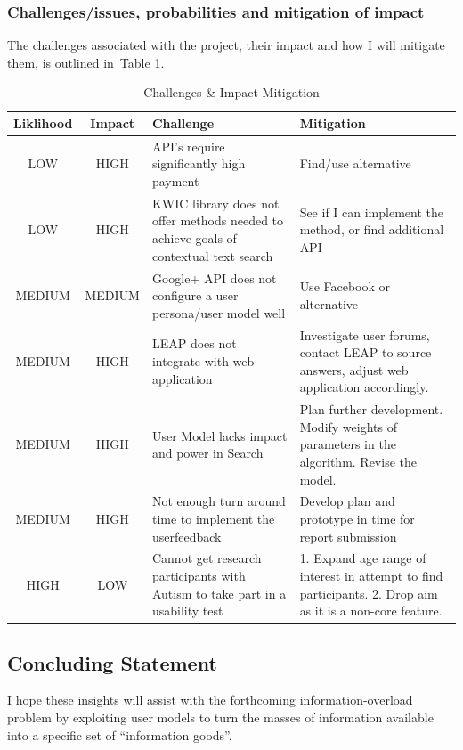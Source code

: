 \documentclass[a4paper, 10pt]{article}
\begin{document}
\subsubsection{Challenges/issues, probabilities and mitigation of impact}
The challenges associated with the project, their impact and how I will mitigate them, is outlined in~Table \ref{risks}. 
\begin{table}[H]
\caption{Challenges \& Impact Mitigation} 
\centering
\begin{tabular}{|c | c | p{5cm} | p{5cm} |}
\hline\hline 
Liklihood & Impact & Challenge & Mitigation\\ [0.5ex]
\hline 
LOW & HIGH & API's require significantly high payment & Find/use alternative\\
\hline 
LOW & HIGH & KWIC library does not offer methods needed to achieve goals of contextual text search & See if I can implement the method, or find additional API\\
\hline 
MEDIUM & MEDIUM & Google+ API does not configure a user persona/user model well & Use Facebook or alternative\\
\hline 
MEDIUM & HIGH & LEAP does not integrate with web application & Investigate user forums, contact LEAP to source answers, adjust web application accordingly.\\
\hline
MEDIUM & HIGH & User Model lacks impact and power in Search & Plan further development. Modify weights of parameters in the algorithm. Revise the model. \\
\hline 
MEDIUM & HIGH & Not enough turn around time to implement the userfeedback & Develop plan and prototype in time for report submission\\
\hline
HIGH & LOW & Cannot get research participants with Autism to take part in a usability test & 1. Expand age range of interest in attempt to find participants. 2. Drop aim as it is a non-core feature.\\ 
\hline

\end{tabular}
\label{risks} 
\end{table}

\subsection{Concluding Statement}\label{future}
I hope these insights will assist with the forthcoming information-overload problem by exploiting user models to turn the masses of information available into a specific set of “information goods”. 
\end{document}
